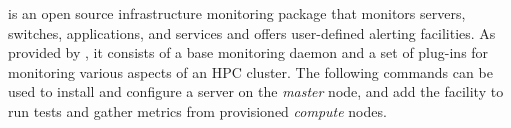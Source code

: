 \Nagios{} is an open source infrastructure monitoring package that monitors
servers, switches, applications, and services and offers user-defined alerting
facilities. As provided by \OHPC{}, it consists of a base monitoring daemon and
a set of plug-ins for monitoring various aspects of an HPC cluster.  The
following commands can be used to install and configure a \Nagios{} server on the {\em
master} node, and add the facility to run tests and gather metrics from
provisioned {\em compute} nodes.
